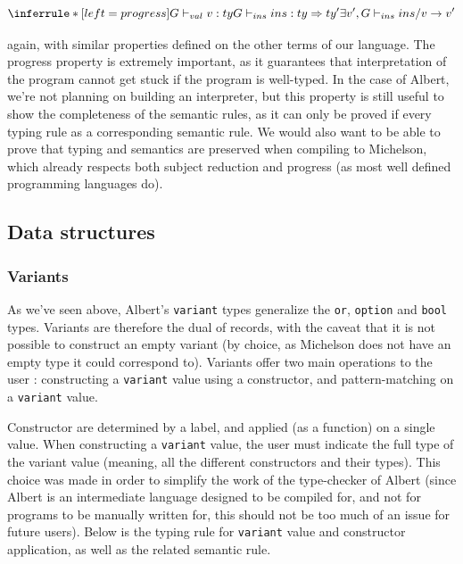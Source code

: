 \documentclass{report}
\begin{document}
$$
\inferrule* [left=progress]
            { G \vdash_{val} v : ty \\ G \vdash_{ins} ins : ty \Rightarrow ty' }
            { \exists v', G \vdash_{ins} ins / v \rightarrow v' }
$$

again, with similar properties defined on the other terms of our language. The progress property is extremely important, as it guarantees that interpretation of the program cannot get stuck if the program is well-typed. In the case of Albert, we're not planning on building an interpreter, but this property is still useful to show the completeness of the semantic rules, as it can only be proved if every typing rule as a corresponding semantic rule. We would also want to be able to prove that typing and semantics are preserved when compiling to Michelson, which already respects both subject reduction and progress (as most well defined programming languages do).

\subsection{Data structures}

\subsubsection{Variants}

As we've seen above, Albert's \texttt{variant} types generalize the \texttt{or}, \texttt{option} and \texttt{bool} types. Variants are therefore the dual of records, with the caveat that it is not possible to construct an empty variant (by choice, as Michelson does not have an empty type it could correspond to). Variants offer two main operations to the user : constructing a \texttt{variant} value using a constructor, and pattern-matching on a \texttt{variant} value.

Constructor are determined by a label, and applied (as a function) on a single value. When constructing a \texttt{variant} value, the user must indicate the full type of the variant value (meaning, all the different constructors and their types). This choice was made in order to simplify the work of the type-checker of Albert (since Albert is an intermediate language designed to be compiled for, and not for programs to be manually written for, this should not be too much of an issue for future users). Below is the typing rule for \texttt{variant} value and constructor application, as well as the related semantic rule.
\end{document}
